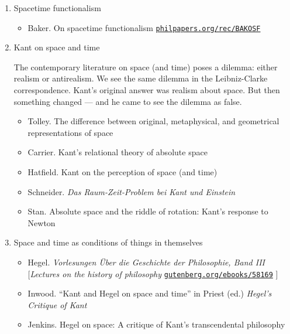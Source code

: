 \documentclass[11pt]{article}
\newcommand\rurl[1]{%
  \href{http://#1}{\nolinkurl{#1}}%
}
\begin{document}
\begin{enumerate}
\item Spacetime functionalism
  \begin{itemize}
  \item Baker. On spacetime functionalism
    \rurl{philpapers.org/rec/BAKOSF}
  \end{itemize}

\item Kant on space and time 
  
  The contemporary literature on space (and time) poses a dilemma:
  either realism or antirealism. We see the same dilemma in the
  Leibniz-Clarke correspondence. Kant's original answer was realism
  about space. But then something changed --- and he came to see the
  dilemma as false.
  \begin{itemize}
  \item Tolley. The difference between original, metaphysical, and
    geometrical representations of space
  \item Carrier. Kant's relational theory of absolute space
  \item Hatfield. Kant on the perception of space (and time)
  \item Schneider. \textit{Das Raum-Zeit-Problem bei Kant und Einstein}
  \item Stan. Absolute space and the riddle of rotation: Kant’s
    response to Newton
  \end{itemize}

\item Space and time as conditions of things in themselves
  \begin{itemize}
  \item Hegel. \textit{Vorlesungen \"Uber die Geschichte der
      Philosophie, Band III} [\textit{Lectures on the history of
      philosophy} \rurl{gutenberg.org/ebooks/58169}]
  \item Inwood. ``Kant and Hegel on space and time'' in Priest (ed.)
    \textit{Hegel's Critique of Kant}
  \item Jenkins. Hegel on space: A critique of Kant's transcendental
    philosophy 
  \end{itemize}
  
\end{enumerate}
\end{document}
